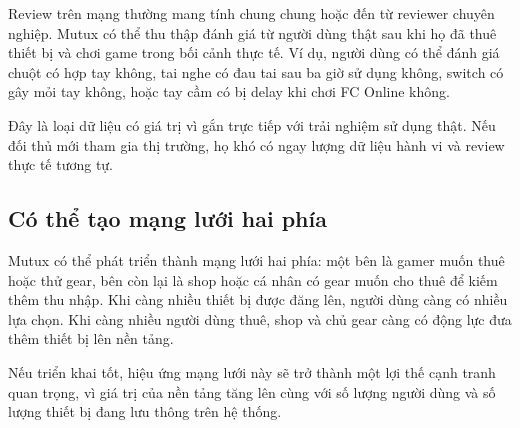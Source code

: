 Review trên mạng thường mang tính chung chung hoặc đến từ reviewer chuyên nghiệp. Mutux có thể thu thập đánh giá từ người dùng thật sau khi họ đã thuê thiết bị và chơi game trong bối cảnh thực tế. Ví dụ, người dùng có thể đánh giá chuột có hợp tay không, tai nghe có đau tai sau ba giờ sử dụng không, switch có gây mỏi tay không, hoặc tay cầm có bị delay khi chơi FC Online không.

Đây là loại dữ liệu có giá trị vì gắn trực tiếp với trải nghiệm sử dụng thật. Nếu đối thủ mới tham gia thị trường, họ khó có ngay lượng dữ liệu hành vi và review thực tế tương tự.

\subsection{Có thể tạo mạng lưới hai phía}

Mutux có thể phát triển thành mạng lưới hai phía: một bên là gamer muốn thuê hoặc thử gear, bên còn lại là shop hoặc cá nhân có gear muốn cho thuê để kiếm thêm thu nhập. Khi càng nhiều thiết bị được đăng lên, người dùng càng có nhiều lựa chọn. Khi càng nhiều người dùng thuê, shop và chủ gear càng có động lực đưa thêm thiết bị lên nền tảng.

Nếu triển khai tốt, hiệu ứng mạng lưới này sẽ trở thành một lợi thế cạnh tranh quan trọng, vì giá trị của nền tảng tăng lên cùng với số lượng người dùng và số lượng thiết bị đang lưu thông trên hệ thống.
